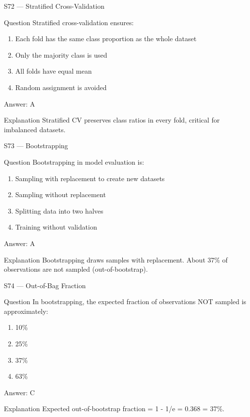\documentclass[aspectratio=169,8pt]{beamer}
\begin{document}
	\begin{frame}{S72 --- Stratified Cross-Validation}
		\begin{block}{Question}
			Stratified cross-validation ensures:
			\begin{enumerate}
				\item Each fold has the same class proportion as the whole dataset
				\item Only the majority class is used
				\item All folds have equal mean
				\item Random assignment is avoided
			\end{enumerate}
		\end{block}
		\begin{exampleblock}{Answer: A}\end{exampleblock}
		\begin{block}{Explanation}
			Stratified CV preserves class ratios in every fold, critical for imbalanced datasets.
		\end{block}
	\end{frame}
	
	\begin{frame}{S73 --- Bootstrapping}
		\begin{block}{Question}
			Bootstrapping in model evaluation is:
			\begin{enumerate}
				\item Sampling with replacement to create new datasets
				\item Sampling without replacement
				\item Splitting data into two halves
				\item Training without validation
			\end{enumerate}
		\end{block}
		\begin{exampleblock}{Answer: A}\end{exampleblock}
		\begin{block}{Explanation}
			Bootstrapping draws samples with replacement. About 37\% of observations are not sampled (out-of-bootstrap).
		\end{block}
	\end{frame}
	
	\begin{frame}{S74 --- Out-of-Bag Fraction}
		\begin{block}{Question}
			In bootstrapping, the expected fraction of observations NOT sampled is approximately:
			\begin{enumerate}
				\item 10\%
				\item 25\%
				\item 37\%
				\item 63\%
			\end{enumerate}
		\end{block}
		\begin{exampleblock}{Answer: C}\end{exampleblock}
		\begin{block}{Explanation}
			Expected out-of-bootstrap fraction = 1 - 1/e = 0.368 = 37\%.
		\end{block}
	\end{frame}
	
\end{document}
